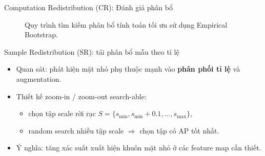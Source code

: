 \documentclass[aspectratio=169,11pt]{beamer}
\begin{document}
\begin{frame}{Computation Redistribution (CR): Đánh giá phân bổ}
\begin{figure}
\caption{Quy trình tìm kiếm phân bổ tính toán tối ưu sử dụng Empirical Bootstrap.}
\end{figure}
\end{frame}

\begin{frame}{Sample Redistribution (SR): tái phân bổ mẫu theo tỉ lệ}
  \begin{itemize}
    \setlength{\itemsep}{5pt}
    \item Quan sát: phát hiện mặt nhỏ phụ thuộc mạnh vào \textbf{phân phối tỉ lệ} và augmentation.\ \cite{guo2022scrfd}
    \item Thiết kế zoom-in / zoom-out search-able:
      \begin{itemize}
        \setlength{\itemsep}{2pt}
        \item chọn tập scale rời rạc \(S=\{s_{\min}, s_{\min}+0.1, \ldots, s_{\max}\}\),
        \item random search nhiều tập scale \(\Rightarrow\) chọn tập có AP tốt nhất.
      \end{itemize}
    \item Ý nghĩa: tăng xác suất xuất hiện khuôn mặt nhỏ ở các feature map cần thiết.
  \end{itemize}
\end{frame}
\end{document}

